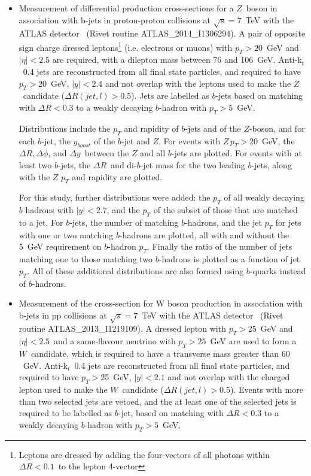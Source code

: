 \documentclass[11pt]{cernrep}
\newcommand{\pt}{\ensuremath{p_{T}}\xspace}
\begin{document}
\begin{itemize}
\item Measurement of differential production cross-sections for a $Z$\ boson
  in association with b-jets in proton-proton collisions at $\sqrt{s} =
  7$~TeV with the ATLAS detector~\cite{Aad:2014dvb} (Rivet routine
  ATLAS\_2014\_I1306294). A pair of opposite sign charge dressed
  leptons\footnote{Leptons are dressed by adding the four-vectors of all
    photons within $\Delta R<0.1$\ to the lepton 4-vector} (i.e. electrons or
  muons) with $\pt>20$~GeV and $|\eta|<2.5$ are required, with a dilepton
  mass between 76 and 106~GeV. Anti-k$_{t}$\ 0.4 jets are reconstructed from
  all final state particles, and required to have $\pt>$20~GeV, $|y|<2.4$ and
  not overlap with the leptons used to make the $Z$~candidate ($\Delta R(jet,
  l)> 0.5$). Jets are labelled as $b$-jets based on matching with $\Delta
  R<0.3$ to a weakly decaying $b$-hadron with $\pt>5$~GeV.

  Distributions include the \pt and rapidity of $b$-jets and of the
  $Z$-boson, and for each $b$-jet, the $y_{boost}$ of the $b$-jet and
  $Z$. For events with $Z\, \pt>20$~GeV, the $\Delta R, \Delta\phi$, and
  $\Delta y$\ between the $Z$ and all $b$-jets are plotted. For events with
  at least two $b$-jets, the $\Delta R$\ and di-$b$-jet mass for the two
  leading $b$-jets, along with the $Z$ \pt and rapidity are plotted.

  For this study, further distributions were added: the \pt of all weakly
  decaying $b$ hadrons with $|y|<2.7$, and the \pt of the subset of those
  that are matched to a jet. For $b$-jets, the number of matching
  $b$-hadrons, and the jet \pt for jets with one or two matching $b$-hadrons
  are plotted, all with and without the 5~GeV requirement on $b$-hadron
  \pt. Finally the ratio of the number of jets matching one to those matching
  two $b$-hadrons is plotted as a function of jet \pt. All of these
  additional distributions are also formed using $b$-quarks instead of
  $b$-hadrons.
  
\item Measurement of the cross-section for W boson production in association
  with b-jets in pp collisions at $\sqrt{s} = 7$~TeV with the ATLAS
  detector~\cite{Aad:2013vka} (Rivet routine ATLAS\_2013\_I1219109). A
  dressed lepton with $\pt>25$~GeV and $|\eta|<2.5$\ and a same-flavour
  neutrino with $\pt>25$~GeV are used to form a $W$~candidate, which is
  required to have a transverse mass greater than $60$~GeV. Anti-k$_{t}$\ 0.4
  jets are reconstructed from all final state particles, and required to have
  $\pt>$25~GeV, $|y|<2.1$ and not overlap with the charged lepton used to
  make the $W$~candidate ($\Delta R(jet, l)> 0.5$). Events with more than two
  selected jets are vetoed, and the at least one of the selected jets is
  required to be labelled as $b$-jet, based on matching with $\Delta R<0.3$
  to a weakly decaying $b$-hadron with $\pt>5$~GeV.


\end{itemize}
\end{document}

